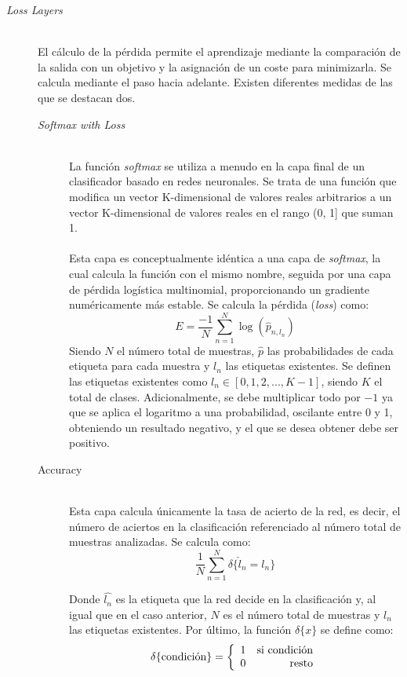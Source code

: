 \begin{description}
\item[\textit{Loss Layers}] \hfill 
\vspace{10pt}
\\
	El cálculo de la pérdida permite el aprendizaje mediante la comparación de la salida con un objetivo y la asignación de un coste para minimizarla. Se calcula mediante el paso hacia adelante. Existen diferentes medidas de las que se destacan dos.
	\vspace{10pt}
	\begin{description}
	\item[\textit{Softmax with Loss}] \hfill 
	\vspace{5pt}
	\\
		La función \textit{softmax} se utiliza a menudo en la capa final de un clasificador basado en redes neuronales. Se trata de una función que modifica un vector K-dimensional de valores reales arbitrarios a un vector K-dimensional de valores reales en el rango (0, 1] que suman 1.\\
		\vspace{-10pt}
		\\
		Esta capa es conceptualmente idéntica a una capa de \textit{softmax}, la cual calcula la función con el mismo nombre, seguida por una capa de pérdida logística multinomial, proporcionando un gradiente numéricamente más estable.
		Se calcula la pérdida (\textit{loss}) como: 
		$$E = \frac{-1}{N} \sum\limits_{n=1}^N \log(\hat{p}_{n,l_n})$$
		Siendo $N$ el número total de muestras, $\hat{p}$ las probabilidades de cada etiqueta para cada muestra y $l_n$ las etiquetas existentes. Se definen las etiquetas existentes como $l_n\in[0, 1, 2, ..., K-1]$, siendo $K$ el total de clases. Adicionalmente, se debe multiplicar todo por $-1$ ya que se aplica el logaritmo a una probabilidad, oscilante entre 0 y 1, obteniendo un resultado negativo, y el que se desea obtener debe ser positivo.
		\vspace{10pt}
	\item[Accuracy] \hfill 
	\vspace{5pt}
	\\
		Esta capa calcula únicamente la tasa de acierto de la red, es decir, el número de aciertos en la clasificación referenciado al número total de muestras analizadas.
		Se calcula como:
		$$\frac{1}{N} \sum\limits_{n=1}^N \delta\{ \hat{l}_n = l_n \}$$

		Donde $\hat{l_n}$ es la etiqueta que la red decide en la clasificación y, al igual que en el caso anterior, $N$  es el número total de muestras y $l_n$ las etiquetas existentes. Por último, la función $\delta\{x\}$ se define como:
		$$\delta\{ \textup{condición}\} = \left\{ \begin{array}{lr} 1 &  \textup{si condición} \\ 0 & \mbox{resto} \end{array} \right.$$
	\end{description}
	
\end{description}
\vspace{10pt}

